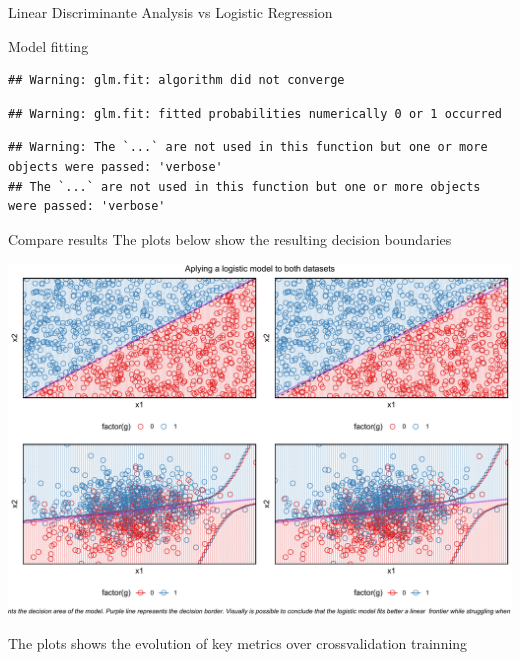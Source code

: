 \documentclass[
  ignorenonframetext,
]{article}
\begin{document}
\begin{frame}[fragile]{Linear Discriminante Analysis vs Logistic Regression}
\begin{block}{Model fitting}
\begin{verbatim}
## Warning: glm.fit: algorithm did not converge
\end{verbatim}

\begin{verbatim}
## Warning: glm.fit: fitted probabilities numerically 0 or 1 occurred
\end{verbatim}

\begin{verbatim}
## Warning: The `...` are not used in this function but one or more objects were passed: 'verbose'
## The `...` are not used in this function but one or more objects were passed: 'verbose'
\end{verbatim}
\end{block}

\begin{block}{Compare results}
\protect\hypertarget{compare-results-2}{}
The plots below show the resulting decision boundaries

\begin{center}\includegraphics{_main_files/figure-beamer/unnamed-chunk-46-1} \end{center}

The plots shows the evolution of key metrics over crossvalidation trainning


\end{block}
\end{frame}
\end{document}
